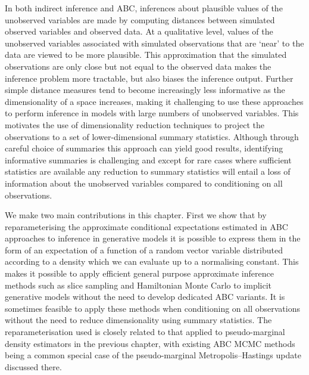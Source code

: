  
In both indirect inference and \ac{ABC}, inferences about plausible values of the unobserved variables are made by computing distances between simulated observed variables and observed data. At a qualitative level, values of the unobserved variables associated with simulated observations that are `near' to the data are viewed to be more plausible. This approximation that the simulated observations are only close but not equal to the observed data makes the inference problem more tractable, but also biases the inference output. Further simple distance measures tend to become increasingly less informative as the dimensionality of a space increases, making it challenging to use these approaches to perform inference in models with large numbers of unobserved variables. This motivates the use of dimensionality reduction techniques to project the observations to a set of lower-dimensional summary statistics. Although through careful choice of summaries this approach can yield good results, identifying informative summaries is challenging and except for rare cases where sufficient statistics are available any reduction to summary statistics will entail a loss of information about the unobserved variables compared to conditioning on all observations.

We make two main contributions in this chapter. First we show that by reparameterising the approximate conditional expectations estimated in \ac{ABC} approaches to inference in generative models it is possible to express them in the form of an expectation of a function of a random vector variable distributed according to a density which we can evaluate up to a normalising constant. This makes it possible to apply efficient general purpose approximate inference methods such as slice sampling and Hamiltonian Monte Carlo to implicit generative models without the need to develop dedicated \ac{ABC} variants. It is sometimes feasible to apply these methods when conditioning on all observations without the need to reduce dimensionality using summary statistics. The reparameterisation used is closely related to that applied to pseudo-marginal density estimators in the previous chapter, with existing \ac{ABC} \ac{MCMC} methods being a common special case of the pseudo-marginal Metropolis--Hastings update discussed there.

